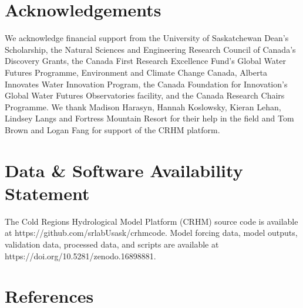 \documentclass[
]{agujournal2019}
\begin{document}
\section{Acknowledgements}\label{acknowledgements}

We acknowledge financial support from the University of Saskatchewan
Dean's Scholarship, the Natural Sciences and Engineering Research
Council of Canada's Discovery Grants, the Canada First Research
Excellence Fund's Global Water Futures Programme, Environment and
Climate Change Canada, Alberta Innovates Water Innovation Program, the
Canada Foundation for Innovation's Global Water Futures Observatories
facility, and the Canada Research Chairs Programme. We thank Madison
Harasyn, Hannah Koslowsky, Kieran Lehan, Lindsey Langs and Fortress
Mountain Resort for their help in the field and Tom Brown and Logan Fang
for support of the CRHM platform.

\section{Data \& Software Availability
Statement}\label{data-software-availability-statement}

The Cold Regions Hydrological Model Platform (CRHM) source code is
available at https://github.com/srlabUsask/crhmcode. Model forcing data,
model outputs, validation data, processed data, and scripts are
available at https://doi.org/10.5281/zenodo.16898881.

\pagebreak

\section*{References}\label{references}
\end{document}
